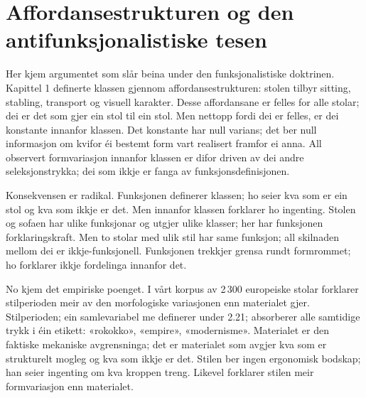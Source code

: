 \section*{Affordansestrukturen og den antifunksjonalistiske tesen}


Her kjem argumentet som slår beina under den funksjonalistiske doktrinen. Kapittel 1 definerte klassen gjennom affordansestrukturen: stolen tilbyr sitting, stabling, transport og visuell karakter. Desse affordansane er felles for alle stolar; dei er det som gjer ein stol til ein stol. Men nettopp fordi dei er felles, er dei konstante innanfor klassen. Det konstante har null varians; det ber null informasjon om kvifor éi bestemt form vart realisert framfor ei anna. All observert formvariasjon innanfor klassen er difor driven av dei andre seleksjonstrykka; dei som ikkje er fanga av funksjonsdefinisjonen.

Konsekvensen er radikal. Funksjonen definerer klassen; ho seier kva som er ein stol og kva som ikkje er det. Men innanfor klassen forklarer ho ingenting. Stolen og sofaen har ulike funksjonar og utgjer ulike klasser; her har funksjonen forklaringskraft. Men to stolar med ulik stil har same funksjon; all skilnaden mellom dei er ikkje-funksjonell. Funksjonen trekkjer grensa rundt formrommet; ho forklarer ikkje fordelinga innanfor det.

No kjem det empiriske poenget. I vårt korpus av 2\,300 europeiske stolar forklarer stilperioden meir av den morfologiske variasjonen enn materialet gjer. Stilperioden; ein samlevariabel me definerer under 2.21; absorberer alle samtidige trykk i éin etikett: «rokokko», «empire», «modernisme». Materialet er den faktiske mekaniske avgrensninga; det er materialet som avgjer kva som er strukturelt mogleg og kva som ikkje er det. Stilen ber ingen ergonomisk bodskap; han seier ingenting om kva kroppen treng. Likevel forklarer stilen meir formvariasjon enn materialet.


